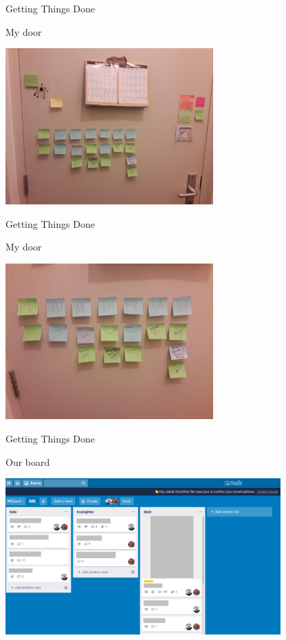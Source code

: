 \begin{frame}{Getting Things Done}
  \begin{block}{My door}
    \begin{center}
      \includegraphics[height=6cm]{img/week-agenda-01.jpg}
    \end{center}
  \end{block}
\end{frame}

\begin{frame}{Getting Things Done}
  \begin{block}{My door}
    \begin{center}
      \includegraphics[height=6cm]{img/week-agenda-02.jpg}
    \end{center}
  \end{block}
\end{frame}

\begin{frame}{Getting Things Done}
  \begin{block}{Our board}
    \begin{center}
      \includegraphics[height=6cm]{img/trello.png}
    \end{center}
  \end{block}
\end{frame}


